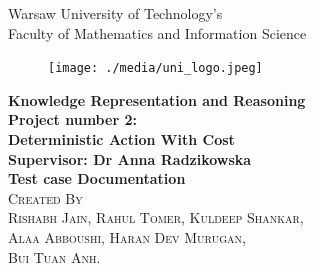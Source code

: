 \documentclass[11pt]{article}
\begin{document}
	\begin{titlepage}
		\begin{center}
			\Large{Warsaw University of Technology's}\\
			\Large{Faculty of Mathematics and Information Science}\\
			[0.3in]
			\begin{figure}[H]
				\centering
				\texttt{[image: ./media/uni\_logo.jpeg]}
				\label{Figure:f04}
			\end{figure}
			\Large{\bfseries Knowledge Representation and Reasoning}\\
			[0.3in]
			\Large{\bfseries Project number 2:}\\
			\Large{\bfseries Deterministic Action With Cost}\\
			\Large{\bfseries Supervisor: Dr Anna Radzikowska}\\
			[0.3in]
			\Large{\bfseries Test case Documentation}\\
			[0.3in]
			\textsc{\Large{Created By}\\
				Rishabh Jain,
				Rahul Tomer,
				Kuldeep Shankar,\\ 
				Alaa Abboushi,
				Haran Dev Murugan,\\
				Bui Tuan Anh.\\}
		\end{center}	
	\end{titlepage}
	\tableofcontents
	\newpage
\end{document}
